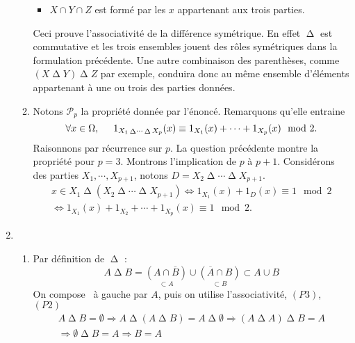 \begin{enumerate}
\begin{enumerate}
\begin{itemize}
\item $X\cap Y \cap Z$ est formé par les $x$ appartenant aux trois parties.
\end{itemize}
Ceci prouve l'associativité de la différence symétrique. En effet $ \mathop{\Delta} $ est commutative et les trois ensembles jouent des rôles symétriques dans la formulation précédente. Une autre combinaison des parenthèses, comme $\left(X \mathop{\Delta}  Y\right) \mathop{\Delta}  Z$ par exemple, conduira donc au même ensemble d'éléments appartenant à une ou trois des parties données.

\item Notons $\mathcal{P}_p$ la propriété donnée par l'énoncé. Remarquons qu'elle entraine
\begin{displaymath}
\forall x\in\Omega, \hspace{0.5cm} 1_{X_1 \mathop{\Delta} \cdots \mathop{\Delta} X_p}(x) \equiv 1_{X_1}(x) + \cdots + 1_{X_p}(x) \mod 2.  
\end{displaymath}
Raisonnons par récurrence sur $p$. La question précédente montre la propriété pour $p=3$. Montrons l'implication de $p$ à $p+1$.\newline
Considérons des parties $X_1, \cdots, X_{p+1}$, notons $D = X_2 \mathop{\Delta} \cdots \mathop{\Delta} X_{p+1}$.
\begin{multline*}
x\in X_1 \mathop{\Delta}  \left( X_2 \mathop{\Delta} \cdots \mathop{\Delta} X_{p+1} \right)
\Leftrightarrow 1_{X_1}(x) + 1_D(x) \equiv 1 \mod 2 \\
\Leftrightarrow 1_{X_1}(x) + 1_{X_2} + \cdots + 1_{X_p}(x) \equiv 1 \mod 2.
\end{multline*}
\end{enumerate}
\item \begin{enumerate}
 \item Par définition de $ \mathop{\Delta} $ :
\begin{displaymath}
 A \mathop{\Delta}  B = \underset{\subset A}{(A\cap \overline{B})} \cup \underset{\subset B}{(\overline{A}\cap B)}
\subset
A \cup B
\end{displaymath}
On \og compose\fg~ à gauche par $A$, puis on utilise l'associativité, $(P3)$, $(P2)$
\begin{multline*}
 A \mathop{\Delta}  B =\emptyset \Rightarrow
 A \mathop{\Delta} \left( A \mathop{\Delta}  B\right) = A \mathop{\Delta}  \emptyset
\Rightarrow \left(A \mathop{\Delta}  A\right) \mathop{\Delta}  B = A\\
\Rightarrow \emptyset  \mathop{\Delta}  B = A \Rightarrow B=A

\end{multline*}
\end{enumerate}
\end{enumerate}

